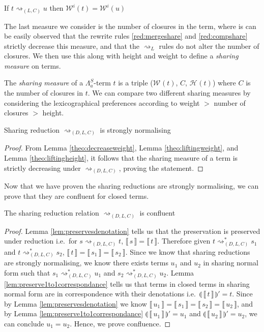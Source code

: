 \documentclass[a4paper,UKenglish,cleveref, autoref]{lipics-v2019}
\newcommand{\FALC}{\Lambda^{S}_{a}}
\newcommand{\readback}[2]{\llbracket \, #1 \, \rrbracket}
\newcommand{\compile}[1]{\llparenthesis \, #1 \, \rrparenthesis}
\newcommand{\height}[2]{\mathcal{H}^{#1}(#2)}
\newcommand{\weight}[2]{\mathcal{W}^{#1}(#2)}
\begin{document}
\begin{lemma} 
\label{theo:liftingweight}
If $t \rightsquigarrow_{(L, C)} u$ then $\weight{i}{t} = \weight{i}{u}$
\end{lemma}

The last measure we consider is the number of closures in the term, where is can be easily observed that the rewrite rules \ref{red:mergeshare} and \ref{red:compshare} strictly decrease this measure, and that the $\rightsquigarrow_{L}$ rules do not alter the number of closures. We then use this along with height and weight to define a \emph{sharing measure} on terms.

\begin{definition}
\label{def:sharingmeasure}
The \emph{sharing measure} of a $\FALC$-term $t$ is a triple ($\weight{}{t}$, $C$, $\height{}{t}$) where $C$ is the number of closures in $t$. We can compare two different sharing measures by considering the lexicographical preferences according to weight $>$ number of closures $>$ height.
\end{definition}

\begin{theorem} 
\label{theo:sharingstronglynormal}
Sharing reduction $\rightsquigarrow_{(D, L, C)}$ is strongly normalising
\end{theorem}
\begin{proof}
From Lemma \ref{theo:decreaseweight}, Lemma \ref{theo:liftingweight}, and Lemma \ref{theo:liftingheight}, it follows that the sharing measure of a term is strictly decreasing under $\rightsquigarrow_{(D, L, C)}$, proving the statement.
\end{proof}

\noindent Now that we have proven the sharing reductions are strongly normalising, we can prove that they are confluent for closed terms.

\begin{theorem}
\label{theo:strongnormal}
The sharing reduction relation $\rightsquigarrow_{(D, L, C)}$ is confluent 
\end{theorem}
\begin{proof}
 Lemma \ref{lem:preservesdenotation} tells us that the preservation is preserved under reduction i.e.\ for $s \rightsquigarrow_{(D, L, C)} t$, $\readback{s}{} = \readback{t}{}$. Therefore given $t \rightsquigarrow^{*}_{(D, L, C)} s_{1}$ and $t \rightsquigarrow^{*}_{(D, L, C)} s_{2}$, $\readback{t}{} = \readback{s_{1}}{} = \readback{s_{2}}{}$. Since we know that sharing reductions are strongly normalising, we know there exists terms $u_{1}$ and $u_{2}$ in sharing normal form such that $s_{1} \rightsquigarrow^{*}_{(D, L, C)} u_{1}$ and $s_{2} \rightsquigarrow^{*}_{(D, L, C)} u_{2}$. Lemma \ref{lem:preserve1to1correspondance} tells us that terms in closed terms in sharing normal form are in correspondence with their denotations i.e.\ $ \compile{\readback{t}{I}}' = t $. Since by Lemma \ref{lem:preservesdenotation} we know $\readback{u_{1}}{} = \readback{s_{1}}{} = \readback{s_{2}}{} = \readback{u_{2}}{}$, and by Lemma \ref{lem:preserve1to1correspondance} $ \compile{\readback{u_{1}}{I}}' = u_{1} $ and $\compile{\readback{u_{2}}{I}}' = u_{2}$, we can conclude $u_{1} = u_{2}$. Hence, we prove confluence. 
\end{proof}
\end{document}
